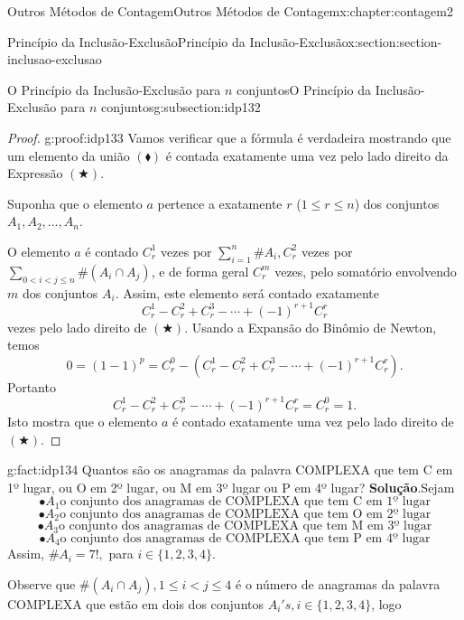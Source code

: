 \documentclass[oneside,10pt,]{book}
\newcommand{\blocktitlefont}{\relax}
\numberwithin{equation}{section}
\newcommand{\lt}{<}
\begin{document}
\begin{chapterptx}{Outros Métodos de Contagem}{}{Outros Métodos de Contagem}{}{}{x:chapter:contagem2}
\begin{sectionptx}{Princípio da Inclusão-Exclusão}{}{Princípio da Inclusão-Exclusão}{}{}{x:section:section-inclusao-exclusao}
\begin{subsectionptx}{O Princípio da Inclusão-Exclusão para \(n\) conjuntos}{}{O Princípio da Inclusão-Exclusão para \(n\) conjuntos}{}{}{g:subsection:idp132}
\begin{proof}{}{g:proof:idp133}
Vamos verificar que a fórmula é verdadeira mostrando que um elemento da união \((\blacklozenge)\) é contada exatamente uma vez pelo lado direito da Expressão \((\bigstar)\).%
\par
Suponha que o elemento \(a\) pertence a exatamente \(r\) (\(1\leq r\leq n\)) dos conjuntos \(A_1, A_2, \ldots, A_n\).%
\par
O elemento \(a\) é contado \(C_r^1\) vezes por \(\sum_{i=1}^{n}\#A_i, C_r^2\) vezes por \(\sum_{0\lt i \lt j\leq n}\#(A_i\cap A_j)\), e de forma geral \(C_r^m\) vezes, pelo somatório envolvendo \(m\) dos conjuntos \(A_i\). Assim, este elemento será contado exatamente%
\begin{equation*}
C_r^1-C_r^2+C_r^3-\cdots+(-1)^{r+1}C_r^r
\end{equation*}
vezes pelo lado direito de \((\bigstar)\). Usando a Expansão do Binômio de Newton, temos%
\begin{equation*}
0 = (1-1)^p = C_r^0 -(C_r^1-C_r^2+C_r^3-\cdots+(-1)^{r+1}C_r^r). 
\end{equation*}
Portanto%
\begin{equation*}
C_r^1-C_r^2+C_r^3-\cdots+(-1)^{r+1}C_r^r = C_r^0 = 1. 
\end{equation*}
Isto mostra que o elemento \(a\) é contado exatamente uma vez pelo lado direito de \((\bigstar)\).%
\end{proof}
\begin{fact}{}{}{g:fact:idp134}%
Quantos são os anagramas da palavra COMPLEXA que tem C em 1º lugar, ou O em 2º lugar, ou M em 3º lugar ou P em 4º lugar?%
\textbf{\blocktitlefont Solução}.\quad{}Sejam%
\begin{equation*}
\bullet A_1 \text{o conjunto dos anagramas de COMPLEXA que tem C em 1º lugar}
\end{equation*}
%
\begin{equation*}
\bullet A_2 \text{o conjunto dos anagramas de COMPLEXA que tem O em 2º lugar}
\end{equation*}
%
\begin{equation*}
\bullet A_3 \text{o conjunto dos anagramas de COMPLEXA que tem M em 3º lugar}
\end{equation*}
%
\begin{equation*}
\bullet A_4 \text{o conjunto dos anagramas de COMPLEXA que tem P em 4º lugar}
\end{equation*}
Assim, \(\#A_i = 7!,\) para  \(i\in \{1, 2, 3, 4\}\).%
\par
Observe que \(\#(A_i\cap A_j), 1\leq i\lt j\leq 4\) é o número de anagramas da palavra COMPLEXA que estão em dois dos conjuntos \(A_i's, i\in\{1, 2, 3, 4\}\), logo%

\end{fact}
\end{subsectionptx}
\end{sectionptx}
\end{chapterptx}
\end{document}
